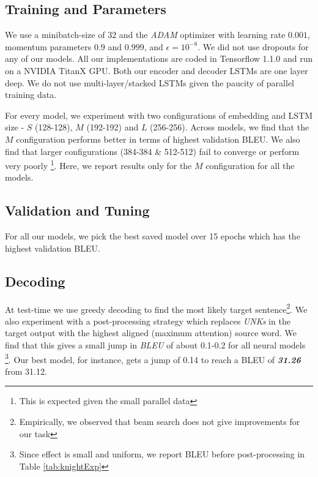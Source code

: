 \subsection{Training and Parameters}
We use a minibatch-size of $32$ and the \textit{ADAM} optimizer \cite{kingma2014adam} with learning rate $0.001$,  momentum parameters $0.9$ and $0.999$, and $\epsilon=10^{-8}$. We did not use dropouts for any of our models. All our implementations are coded in Tensorflow 1.1.0 and run on a NVIDIA TitanX GPU. Both our encoder and decoder LSTMs are one layer deep. We do not use multi-layer/stacked LSTMs \cite{luong2015effective} given the paucity of parallel training data.


For every model, we experiment with two configurations of embedding and LSTM size - $S$ (128-128), $M$ (192-192) and $L$ (256-256). Across models, we find that the $M$ configuration performs better in terms of highest validation BLEU.  We also find that larger configurations (384-384 \& 512-512) fail to converge or perform very poorly \footnote{This is expected given the small parallel data}. Here, we report results only for the $M$ configuration for all the models.


\subsection{Validation and Tuning}
For all our models, we pick the best saved model over 15 epochs which has the highest validation BLEU. %

\subsection{Decoding}
At test-time we use greedy decoding to find the most likely target sentence\footnote{Empirically, we observed that beam search does not give improvements for our task}. We also experiment with a post-processing strategy which replaces \emph{UNKs} in the target output with the highest aligned (maximum attention) source word. We find that this gives a small jump in \emph{BLEU} of about 0.1-0.2 for all neural models \footnote{Since effect is small and uniform, we report BLEU before post-processing in Table \ref{tab:knightExp} }. Our best model, for instance, gets a jump of 0.14 to reach a BLEU of \emph{\textbf{31.26}} from 31.12.



